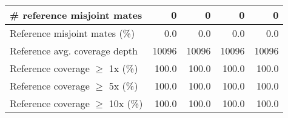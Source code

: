 \documentclass[12pt,a4paper]{article}
\begin{document}
\begin{table}[ht]
\begin{center}
\begin{tabular}{|l*{4}{|r}|}
\# reference misjoint mates & 0 & 0 & 0 & 0 \\ \hline
Reference misjoint mates (\%) & 0.0 & 0.0 & 0.0 & 0.0 \\ \hline
Reference avg. coverage depth & 10096 & 10096 & 10096 & 10096 \\ \hline
Reference coverage $\geq$ 1x (\%) & 100.0 & 100.0 & 100.0 & 100.0 \\ \hline
Reference coverage $\geq$ 5x (\%) & 100.0 & 100.0 & 100.0 & 100.0 \\ \hline
Reference coverage $\geq$ 10x (\%) & 100.0 & 100.0 & 100.0 & 100.0 \\ \hline
\end{tabular}
\end{center}
\end{table}
\end{document}
